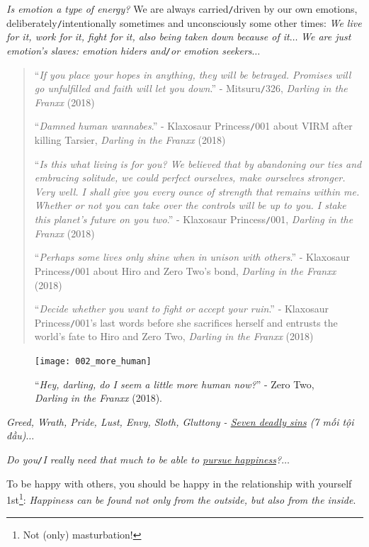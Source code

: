 \documentclass[12pt]{article}
\begin{document}
{\it Is emotion a type of energy?} We are always carried{\tt/}driven by our own emotions, deliberately{\tt/}intentionally sometimes and unconsciously some other times: {\it We live for it, work for it, fight for it, also being taken down because of it}$\ldots$ {\it We are just emotion's slaves: emotion hiders and{\tt/}or emotion seekers}$\ldots$
\begin{quotation}
	``{\it If you place your hopes in anything, they will be betrayed. Promises will go unfulfilled and faith will let you down}.'' - Mitsuru{\tt/}326, {\it {\sc Darling} in the {\sc Franxx}} (2018)
	
	``{\it Damned human wannabes}.'' - Klaxosaur Princess{\tt/}001 about VIRM after killing Tarsier, {\it {\sc Darling} in the {\sc Franxx}} (2018)
	
	``{\it Is this what living is for you? We believed that by abandoning our ties and embracing solitude, we could perfect ourselves, make ourselves stronger. Very well. I shall give you every ounce of strength that remains within me. Whether or not you can take over the controls will be up to you. I stake this planet's future on you two}.'' - Klaxosaur Princess{\tt/}001, {\it {\sc Darling} in the {\sc Franxx}} (2018)
	
	``{\it Perhaps some lives only shine when in unison with others}.'' - Klaxosaur Princess{\tt/}001 about Hiro and Zero Two's bond, {\it {\sc Darling} in the {\sc Franxx}} (2018)
	
	``{\it Decide whether you want to fight or accept your ruin}.'' - Klaxosaur Princess{\tt/}001's last words before she sacrifices herself and entrusts the world's fate to Hiro and Zero Two, {\it {\sc Darling} in the {\sc Franxx}} (2018)
\end{quotation}

\begin{figure}[h]
	\centering
	\texttt{[image: 002\_more\_human]}
	\caption{``{\it Hey, darling, do I seem a little more human now?}'' - Zero Two, {\it {\sc Darling} in the {\sc Franxx}} (2018).}
	\label{fig5}
\end{figure}
{\it Greed, Wrath, Pride, Lust, Envy, Sloth, Gluttony - \href{https://en.wikipedia.org/wiki/Seven_deadly_sins}{Seven deadly sins} (7 mối tội đầu)}$\ldots$

{\it Do you{\tt/}I really need that much to be able to \href{https://www.imdb.com/title/tt0454921/}{pursue happiness}?}$\ldots$

To be happy with others, you should be happy in the relationship with yourself 1st\footnote{Not (only) masturbation!}: {\it Happiness can be found not only from the outside, but also from the inside}.
\end{document}
